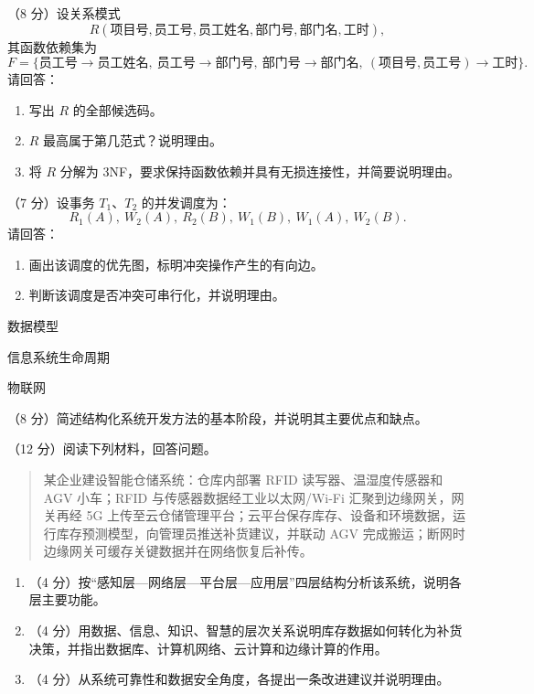 \documentclass[a4paper,11pt]{article}
\begin{document}
\q （8 分）设关系模式
\[
R(\text{项目号},\text{员工号},\text{员工姓名},\text{部门号},\text{部门名},\text{工时}),
\]
其函数依赖集为
\[
F=\{\text{员工号}\to\text{员工姓名},\ \text{员工号}\to\text{部门号},\ \text{部门号}\to\text{部门名},\ (\text{项目号},\text{员工号})\to\text{工时}\}.
\]
请回答：
\begin{enumerate}[label=（\arabic*）, leftmargin=2.4em, itemsep=1pt]
  \item 写出 $R$ 的全部候选码。
  \item $R$ 最高属于第几范式？说明理由。
  \item 将 $R$ 分解为 3NF，要求保持函数依赖并具有无损连接性，并简要说明理由。
\end{enumerate}
\anslines{7cm}

\q （7 分）设事务 $T_1$、$T_2$ 的并发调度为：
\[
R_1(A),\ W_2(A),\ R_2(B),\ W_1(B),\ W_1(A),\ W_2(B).
\]
请回答：
\begin{enumerate}[label=（\arabic*）, leftmargin=2.4em, itemsep=1pt]
  \item 画出该调度的优先图，标明冲突操作产生的有向边。
  \item 判断该调度是否冲突可串行化，并说明理由。
\end{enumerate}
\anslines{7cm}



\q 数据模型
\anslines{3cm}

\q 信息系统生命周期
\anslines{3cm}

\q 物联网
\anslines{3cm}


\q （8 分）简述结构化系统开发方法的基本阶段，并说明其主要优点和缺点。
\anslines{5.5cm}


\q （12 分）阅读下列材料，回答问题。
\begin{quote}\small
某企业建设智能仓储系统：仓库内部署 RFID 读写器、温湿度传感器和 AGV 小车；RFID 与传感器数据经工业以太网/Wi-Fi 汇聚到边缘网关，网关再经 5G 上传至云仓储管理平台；云平台保存库存、设备和环境数据，运行库存预测模型，向管理员推送补货建议，并联动 AGV 完成搬运；断网时边缘网关可缓存关键数据并在网络恢复后补传。
\end{quote}
\begin{enumerate}[label=（\arabic*）, leftmargin=2.4em, itemsep=1pt]
  \item （4 分）按“感知层—网络层—平台层—应用层”四层结构分析该系统，说明各层主要功能。
  \item （4 分）用数据、信息、知识、智慧的层次关系说明库存数据如何转化为补货决策，并指出数据库、计算机网络、云计算和边缘计算的作用。
  \item （4 分）从系统可靠性和数据安全角度，各提出一条改进建议并说明理由。
\end{enumerate}
\anslines{12cm}
\end{document}
